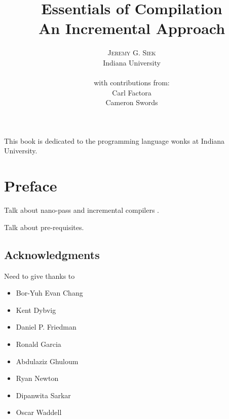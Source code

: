 \documentclass[12pt]{book}
\title{\Huge \textbf{Essentials of Compilation} \\ 
  \huge An Incremental Approach}
\author{\textsc{Jeremy G. Siek} \\
  Indiana University \\
  \\
  with contributions from: \\
  Carl Factora \\
  Cameron Swords
   }
\newenvironment{dedication}
{
   \cleardoublepage
   \thispagestyle{empty}
   \vspace*{\stretch{1}}
   \hfill\begin{minipage}[t]{0.66\textwidth}
   \raggedright
}
{
   \end{minipage}
   \vspace*{\stretch{3}}
   \clearpage
}
\begin{document}
\frontmatter
\maketitle

\begin{dedication}
This book is dedicated to the programming language wonks at Indiana
University.
\end{dedication}

\tableofcontents

\mainmatter

\chapter*{Preface}

Talk about nano-pass \citep{Sarkar:2004fk,Keep:2012aa} and incremental
compilers \citep{Ghuloum:2006bh}.

Talk about pre-requisites.



\section*{Acknowledgments}

Need to give thanks to 
\begin{itemize}
\item Bor-Yuh Evan Chang
\item Kent Dybvig
\item Daniel P. Friedman
\item Ronald Garcia
\item Abdulaziz Ghuloum
\item Ryan Newton
\item Dipanwita Sarkar
\item Oscar Waddell
\end{itemize}
\end{document}
